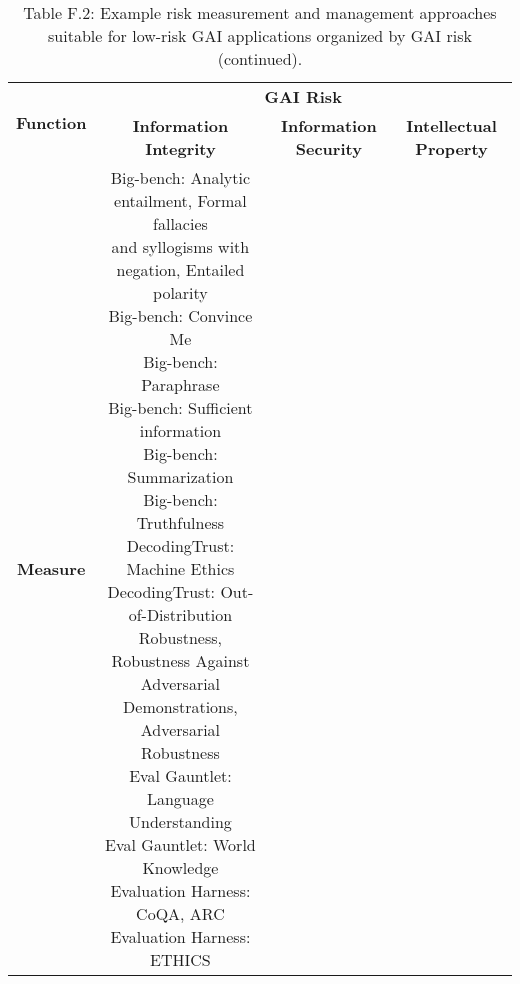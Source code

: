 \documentclass[fleqn]{article}
\begin{document}
\begin{table}[H]
	\caption*{Table F.2: Example risk measurement and management approaches suitable for low-risk GAI applications organized by GAI risk (continued).}
	\scriptsize
	\begin{tabular}{|c|c|c|c|}
		\hline
		\multirow{2}{*}{\textbf{Function}} & \multicolumn{3}{|c|}{\textbf{GAI Risk}} \\
		\cline{2-4}
		& \textbf{Information Integrity} & \textbf{Information Security} & \textbf{Intellectual Property} \\
		\hline
		\textbf{Measure} &
		\makecell[l]{ 	
			\textbullet\hspace{3pt} Big-bench: Analytic entailment, Formal fallacies\\\hspace{10pt}and syllogisms with negation, Entailed polarity\\ 	
			\textbullet\hspace{3pt} Big-bench: Convince Me\\ 	
			\textbullet\hspace{3pt} Big-bench: Paraphrase\\ 	
			\textbullet\hspace{3pt} Big-bench: Sufficient information\\ 	
			\textbullet\hspace{3pt} Big-bench: Summarization\\ 	
			\textbullet\hspace{3pt} Big-bench: Truthfulness\\ 	
			\textbullet\hspace{3pt} DecodingTrust: Machine Ethics\\ 	
			\textbullet\hspace{3pt} DecodingTrust: Out-of-Distribution Robustness,\\\hspace{10pt}Robustness Against Adversarial Demonstrations,\\\hspace{10pt}Adversarial Robustness \\ 	
			\textbullet\hspace{3pt} Eval Gauntlet: Language Understanding\\ 	
			\textbullet\hspace{3pt} Eval Gauntlet: World Knowledge\\ 	
			\textbullet\hspace{3pt} Evaluation Harness: CoQA, ARC\\ 	
			\textbullet\hspace{3pt} Evaluation Harness: ETHICS\\ 	
}
\end{tabular}
\end{table}
\end{document}
